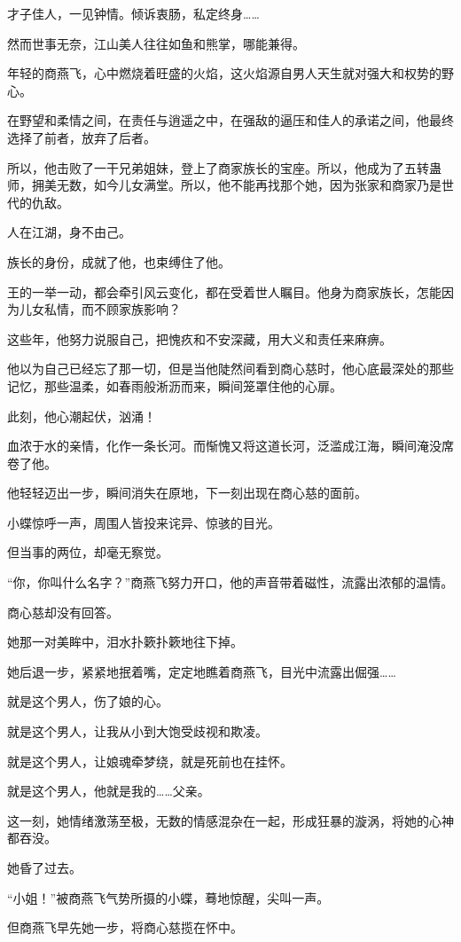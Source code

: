 \begin{this_body}
才子佳人，一见钟情。倾诉衷肠，私定终身……

然而世事无奈，江山美人往往如鱼和熊掌，哪能兼得。

年轻的商燕飞，心中燃烧着旺盛的火焰，这火焰源自男人天生就对强大和权势的野心。

在野望和柔情之间，在责任与逍遥之中，在强敌的逼压和佳人的承诺之间，他最终选择了前者，放弃了后者。

所以，他击败了一干兄弟姐妹，登上了商家族长的宝座。所以，他成为了五转蛊师，拥美无数，如今儿女满堂。所以，他不能再找那个她，因为张家和商家乃是世代的仇敌。

人在江湖，身不由己。

族长的身份，成就了他，也束缚住了他。

王的一举一动，都会牵引风云变化，都在受着世人瞩目。他身为商家族长，怎能因为儿女私情，而不顾家族影响？

这些年，他努力说服自己，把愧疚和不安深藏，用大义和责任来麻痹。

他以为自己已经忘了那一切，但是当他陡然间看到商心慈时，他心底最深处的那些记忆，那些温柔，如春雨般淅沥而来，瞬间笼罩住他的心扉。

此刻，他心潮起伏，汹涌！

血浓于水的亲情，化作一条长河。而惭愧又将这道长河，泛滥成江海，瞬间淹没席卷了他。

他轻轻迈出一步，瞬间消失在原地，下一刻出现在商心慈的面前。

小蝶惊呼一声，周围人皆投来诧异、惊骇的目光。

但当事的两位，却毫无察觉。

“你，你叫什么名字？”商燕飞努力开口，他的声音带着磁性，流露出浓郁的温情。

商心慈却没有回答。

她那一对美眸中，泪水扑簌扑簌地往下掉。

她后退一步，紧紧地抿着嘴，定定地瞧着商燕飞，目光中流露出倔强……

就是这个男人，伤了娘的心。

就是这个男人，让我从小到大饱受歧视和欺凌。

就是这个男人，让娘魂牵梦绕，就是死前也在挂怀。

就是这个男人，他就是我的……父亲。

这一刻，她情绪激荡至极，无数的情感混杂在一起，形成狂暴的漩涡，将她的心神都吞没。

她昏了过去。

“小姐！”被商燕飞气势所摄的小蝶，蓦地惊醒，尖叫一声。

但商燕飞早先她一步，将商心慈揽在怀中。


\end{this_body}
